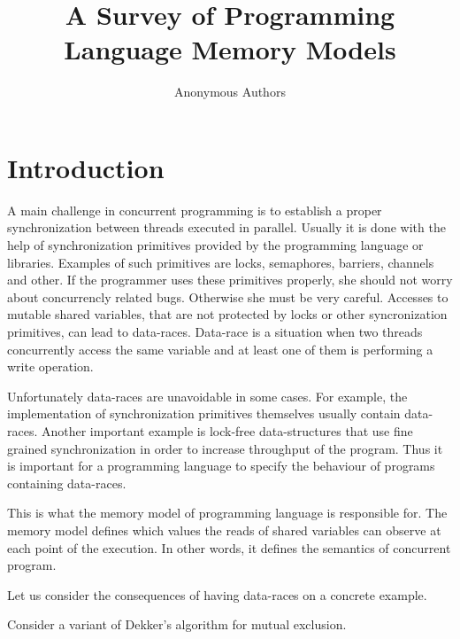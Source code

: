 \documentclass[a4paper,twoside,11pt]{article}
\author{Anonymous Authors}
\title{A Survey of Programming Language Memory Models}
\date{}
\numberwithin{equation}{section}
\begin{document}
\maketitle

\begin{abstract}
\end{abstract}

\section{Introduction}

A main challenge in concurrent programming is 
to establish a proper synchronization between threads executed in parallel.     
Usually it is done with the help of synchronization primitives
provided by the programming language or libraries.
Examples of such primitives are locks, semaphores, barriers, channels and other.
If the programmer uses these primitives properly, she should not worry about concurrencly related bugs.
Otherwise she must be very careful. Accesses to mutable shared variables, 
that are not protected by locks or other syncronization primitives, can lead to data-races. 
Data-race is a situation when two threads concurrently access the same variable and at least one of them is performing a write operation.


Unfortunately data-races are unavoidable in some cases. 
For example, the implementation of synchronization primitives themselves usually contain data-races.
Another important example is lock-free data-structures that use fine grained synchronization in order 
to increase throughput of the program.
Thus it is important for a programming language to specify the behaviour of programs containing data-races.

This is what the memory model of programming language is responsible for.  
The memory model defines which values the reads of shared variables can observe at each point of the execution. 
In other words, it defines the semantics of concurrent program.

Let us consider the consequences of having data-races on a concrete example.

Consider a variant of Dekker's algorithm for mutual exclusion.
\end{document}
